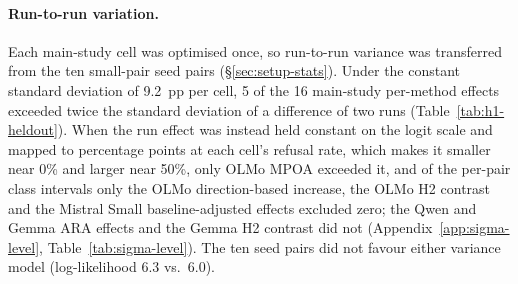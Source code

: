 \paragraph{Run-to-run variation.} Each main-study cell was optimised once, so
run-to-run variance was transferred from the ten small-pair seed pairs
(\S\ref{sec:setup-stats}). Under the constant standard deviation of 9.2~pp
per cell, 5 of the 16 main-study per-method effects exceeded twice the
standard deviation of a difference of two runs (Table~\ref{tab:h1-heldout}).
When the run effect was instead held constant on the logit scale and mapped to
percentage points at each cell's refusal rate, which makes it smaller near 0\%
and larger near 50\%, only OLMo MPOA exceeded it, and of the per-pair class
intervals only the OLMo direction-based increase, the OLMo H2 contrast and the
Mistral Small baseline-adjusted effects excluded zero; the Qwen and Gemma ARA
effects and the Gemma H2 contrast did not
(Appendix~\ref{app:sigma-level}, Table~\ref{tab:sigma-level}). The ten seed
pairs did not favour either variance model (log-likelihood 6.3 vs.\ 6.0).



